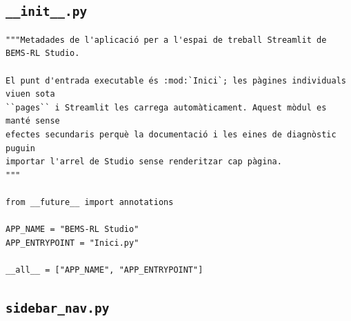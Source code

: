 \documentclass[10pt,a4paper]{article}
\begin{document}

\subsection{\texorpdfstring{\texttt{\_\_init\_\_.py}}{\_\_init\_\_.py}}

\begin{lstlisting}[style=studioPython,caption={\_\_init\_\_.py},label={lst:init---py}]
"""Metadades de l'aplicació per a l'espai de treball Streamlit de BEMS-RL Studio.

El punt d'entrada executable és :mod:`Inici`; les pàgines individuals viuen sota
``pages`` i Streamlit les carrega automàticament. Aquest mòdul es manté sense
efectes secundaris perquè la documentació i les eines de diagnòstic puguin
importar l'arrel de Studio sense renderitzar cap pàgina.
"""

from __future__ import annotations

APP_NAME = "BEMS-RL Studio"
APP_ENTRYPOINT = "Inici.py"

__all__ = ["APP_NAME", "APP_ENTRYPOINT"]
\end{lstlisting}


\subsection{\texorpdfstring{\texttt{sidebar\_nav.py}}{sidebar\_nav.py}}
\end{document}
